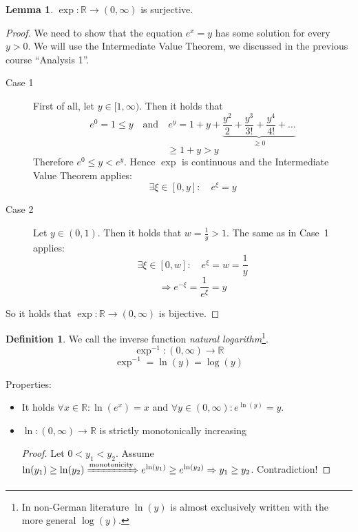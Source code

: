 \documentclass[a4paper,landscape,twocolumn]{article}
\theoremstyle{definition}
\newtheorem{defi}{Definition}
\newtheorem{lemma}{Lemma}
\begin{document}
\begin{lemma}
  $\exp: \mathbb R \to (0,\infty)$
  is surjective.
\end{lemma}
\begin{proof}
  We need to show that the equation $e^x = y$ has some solution for every $y > 0$.
  We will use the Intermediate Value Theorem, we discussed in the previous course \enquote{Analysis 1}.

  \begin{description}
    \item[Case 1]
      First of all, let $y \in [1,\infty)$. Then it holds that
      \[ e^0 = 1 \leq y \quad\text{and}\quad e^y = 1 + y + \underbrace{\frac{y^2}{2} + \frac{y^3}{3!} + \frac{y^4}{4!} + \ldots}_{\geq 0} \]
      \[ \geq 1 + y > y \]
      Therefore $e^0 \leq y < e^y$.
      Hence $\exp$ is continuous and the Intermediate Value Theorem applies:
      \[ \exists \xi \in [0,y]: \quad e^\xi = y \]
    \item[Case 2]
      Let $y \in (0,1)$. Then it holds that $w = \frac1{y} > 1$.
      The same as in Case~1 applies:
      \[ \exists \xi \in [0,w]: \quad e^\xi = w = \frac1{y} \]
      \[ \Rightarrow e^{-\xi} = \frac{1}{e^\xi} = y \]
  \end{description}

  So it holds that $\exp: \mathbb R \to (0,\infty)$ is bijective.
\end{proof}

\begin{defi}
  We call the inverse function \emph{natural logarithm}\footnote{In non-German literature $\ln(y)$ is almost exclusively written with the more general $\log(y)$.}.
  \[ \exp^{-1}: (0,\infty) \to \mathbb R \]
  \[ \exp^{-1} = \ln(y) = \log(y) \]

  Properties:
  \begin{itemize}
    \item It holds $\forall x \in \mathbb R: \ln(e^x) = x$ and $\forall y \in (0,\infty): e^{\ln(y)} = y$.
    \item $\ln: (0,\infty) \to \mathbb R$ is strictly monotonically increasing
      \begin{proof}
        Let $0 < y_1 < y_2$. Assume $\ln(y_1) \geq \ln(y_2) \xRightarrow{\text{monotonicity}} e^{\ln(y_1)} \geq e^{\ln(y_2)} \Rightarrow y_1 \geq y_2$. Contradiction!
      \end{proof}
  \end{itemize}
\end{defi}
\end{document}

